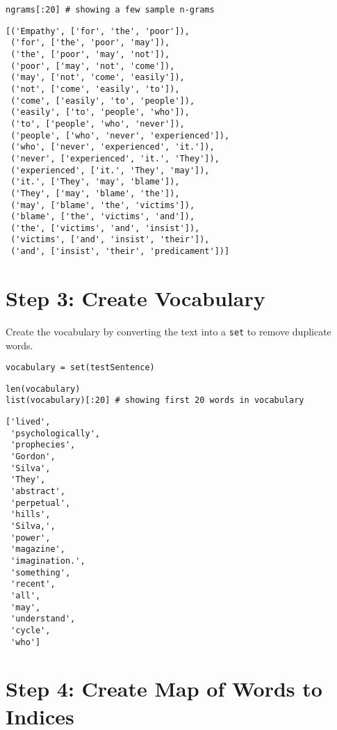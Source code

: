 \documentclass[
]{article}
\begin{document}
\begin{verbatim}
ngrams[:20] # showing a few sample n-grams
\end{verbatim}

\begin{verbatim}
[('Empathy', ['for', 'the', 'poor']),
 ('for', ['the', 'poor', 'may']),
 ('the', ['poor', 'may', 'not']),
 ('poor', ['may', 'not', 'come']),
 ('may', ['not', 'come', 'easily']),
 ('not', ['come', 'easily', 'to']),
 ('come', ['easily', 'to', 'people']),
 ('easily', ['to', 'people', 'who']),
 ('to', ['people', 'who', 'never']),
 ('people', ['who', 'never', 'experienced']),
 ('who', ['never', 'experienced', 'it.']),
 ('never', ['experienced', 'it.', 'They']),
 ('experienced', ['it.', 'They', 'may']),
 ('it.', ['They', 'may', 'blame']),
 ('They', ['may', 'blame', 'the']),
 ('may', ['blame', 'the', 'victims']),
 ('blame', ['the', 'victims', 'and']),
 ('the', ['victims', 'and', 'insist']),
 ('victims', ['and', 'insist', 'their']),
 ('and', ['insist', 'their', 'predicament'])]
\end{verbatim}

\hypertarget{step-3-create-vocabulary}{%
\section{Step 3: Create Vocabulary}\label{step-3-create-vocabulary}}

Create the vocabulary by converting the text into a
\texttt{set} to remove duplicate words.

\begin{verbatim}
vocabulary = set(testSentence)
\end{verbatim}

\begin{verbatim}
len(vocabulary)
list(vocabulary)[:20] # showing first 20 words in vocabulary
\end{verbatim}

\begin{verbatim}
['lived',
 'psychologically',
 'prophecies',
 'Gordon',
 'Silva',
 'They',
 'abstract',
 'perpetual',
 'hills',
 'Silva,',
 'power',
 'magazine',
 'imagination.',
 'something',
 'recent',
 'all',
 'may',
 'understand',
 'cycle',
 'who']
\end{verbatim}

\hypertarget{step-4-create-map-of-words-to-indices}{%
\section{Step 4: Create Map of Words to
Indices}\label{step-4-create-map-of-words-to-indices}}
\end{document}
